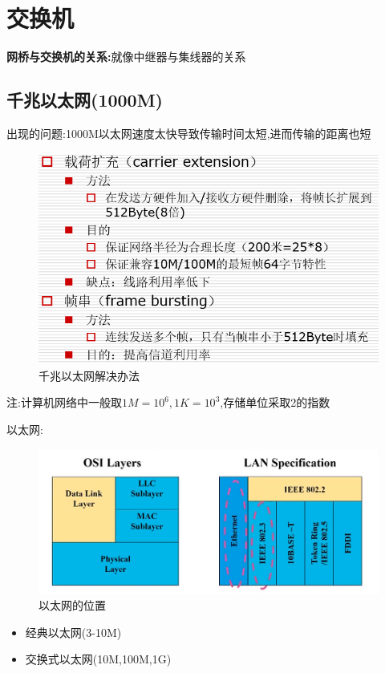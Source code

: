 \documentclass[UTF8,a4paper]{ctexart}
\begin{document}
\section{交换机}
\textbf{网桥与交换机的关系:}就像中继器与集线器的关系

\subsection{千兆以太网(1000M)}
出现的问题:1000M以太网速度太快导致传输时间太短,进而传输的距离也短
\begin{figure}[H]
  \centering
  \includegraphics[scale = 0.5]{assets/jisuanjiwangluo_72a2b.png}
  \caption{千兆以太网解决办法}
\end{figure}

注:计算机网络中一般取$1M = 10^6 , 1K = 10^3$,存储单位采取2的指数


以太网:
\begin{figure}[H]
  \centering
  \includegraphics{assets/jisuanjiwangluo_4a63a.png}
  \caption{以太网的位置}
\end{figure}

\begin{itemize}
  \item 经典以太网(3-10M)
  \item 交换式以太网(10M,100M,1G)
\end{itemize}
\end{document}
